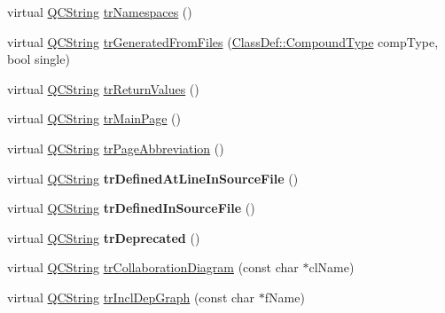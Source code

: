 \begin{DoxyCompactItemize}
\item 
virtual \mbox{\hyperlink{class_q_c_string}{Q\+C\+String}} \mbox{\hyperlink{class_translator_portuguese_ae023699a28ee15d6f616775c819a2e3a}{tr\+Namespaces}} ()
\item 
virtual \mbox{\hyperlink{class_q_c_string}{Q\+C\+String}} \mbox{\hyperlink{class_translator_portuguese_a8bc2494fc389b136706de6fd93d8547f}{tr\+Generated\+From\+Files}} (\mbox{\hyperlink{class_class_def_ae70cf86d35fe954a94c566fbcfc87939}{Class\+Def\+::\+Compound\+Type}} comp\+Type, bool single)
\item 
virtual \mbox{\hyperlink{class_q_c_string}{Q\+C\+String}} \mbox{\hyperlink{class_translator_portuguese_ac68e39b588ad262e332b86eb9af5f77e}{tr\+Return\+Values}} ()
\item 
virtual \mbox{\hyperlink{class_q_c_string}{Q\+C\+String}} \mbox{\hyperlink{class_translator_portuguese_a213360091f1c3ab1ab95de2abf1c7a34}{tr\+Main\+Page}} ()
\item 
virtual \mbox{\hyperlink{class_q_c_string}{Q\+C\+String}} \mbox{\hyperlink{class_translator_portuguese_a14ece07610419a00727fcd6fd852d556}{tr\+Page\+Abbreviation}} ()
\item 
\mbox{\label{class_translator_portuguese_ac221da9032740897823818dc88a3a820}} 
virtual \mbox{\hyperlink{class_q_c_string}{Q\+C\+String}} {\bfseries tr\+Defined\+At\+Line\+In\+Source\+File} ()
\item 
\mbox{\label{class_translator_portuguese_a228ade90dcb3e124fb0aca0bb1bb1657}} 
virtual \mbox{\hyperlink{class_q_c_string}{Q\+C\+String}} {\bfseries tr\+Defined\+In\+Source\+File} ()
\item 
\mbox{\label{class_translator_portuguese_afcebfa5c732d5f8fbe0fa7d701b4e5cf}} 
virtual \mbox{\hyperlink{class_q_c_string}{Q\+C\+String}} {\bfseries tr\+Deprecated} ()
\item 
virtual \mbox{\hyperlink{class_q_c_string}{Q\+C\+String}} \mbox{\hyperlink{class_translator_portuguese_a389d0468eeda3d5b7fb6bd8df4687c20}{tr\+Collaboration\+Diagram}} (const char $\ast$cl\+Name)
\item 
virtual \mbox{\hyperlink{class_q_c_string}{Q\+C\+String}} \mbox{\hyperlink{class_translator_portuguese_ad46a07d2fef1865f23f4b907165d1213}{tr\+Incl\+Dep\+Graph}} (const char $\ast$f\+Name)
\item 

\end{DoxyCompactItemize}
